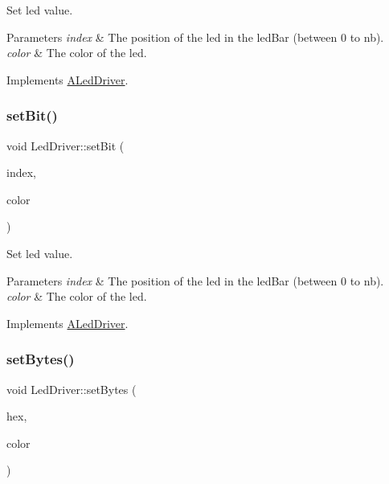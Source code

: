 Set led value. 


\begin{DoxyParams}{Parameters}
{\em index} & The position of the led in the led\+Bar (between 0 to nb). \\
\hline
{\em color} & The color of the led. \\
\hline
\end{DoxyParams}


Implements \hyperlink{classALedDriver_acbc8507c36f0f4fa3afb845d81e56eb2}{A\+Led\+Driver}.

\mbox{\label{classLedDriver_a1856fb030d88bcacdc37dfce7f0f8136}} 
\subsubsection{\texorpdfstring{set\+Bit()}{setBit()}\hspace{0.1cm}{\footnotesize\ttfamily [5/5]}}
{\footnotesize\ttfamily void Led\+Driver\+::set\+Bit (\begin{DoxyParamCaption}\item[{int}]{index,  }\item[{Led\+Color}]{color }\end{DoxyParamCaption})\hspace{0.3cm}{\ttfamily [virtual]}}



Set led value. 


\begin{DoxyParams}{Parameters}
{\em index} & The position of the led in the led\+Bar (between 0 to nb). \\
\hline
{\em color} & The color of the led. \\
\hline
\end{DoxyParams}


Implements \hyperlink{classALedDriver_acbc8507c36f0f4fa3afb845d81e56eb2}{A\+Led\+Driver}.

\mbox{\label{classLedDriver_a66512dd673a81681d3597e301af13759}} 
\subsubsection{\texorpdfstring{set\+Bytes()}{setBytes()}\hspace{0.1cm}{\footnotesize\ttfamily [1/6]}}
{\footnotesize\ttfamily void Led\+Driver\+::set\+Bytes (\begin{DoxyParamCaption}\item[{uint}]{hex,  }\item[{Led\+Color}]{color }\end{DoxyParamCaption})\hspace{0.3cm}{\ttfamily [virtual]}}



